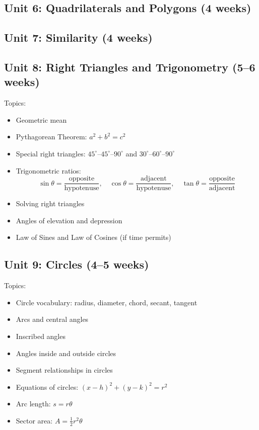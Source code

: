 \documentclass[12pt,oneside]{book}
\begin{document}
\subsection*{Unit 6: Quadrilaterals and Polygons (4 weeks)}

\subsection*{Unit 7: Similarity (4 weeks)}

\subsection*{Unit 8: Right Triangles and Trigonometry (5--6 weeks)}
Topics:
\begin{itemize}[leftmargin=2em]
    \item Geometric mean
    \item Pythagorean Theorem: $a^2 + b^2 = c^2$
    \item Special right triangles: $45^\circ$--$45^\circ$--$90^\circ$ and $30^\circ$--$60^\circ$--$90^\circ$
    \item Trigonometric ratios:
    \[
    \sin\theta = \frac{\text{opposite}}{\text{hypotenuse}},\quad
    \cos\theta = \frac{\text{adjacent}}{\text{hypotenuse}},\quad
    \tan\theta = \frac{\text{opposite}}{\text{adjacent}}
    \]
    \item Solving right triangles
    \item Angles of elevation and depression
    \item Law of Sines and Law of Cosines (if time permits)
\end{itemize}

\subsection*{Unit 9: Circles (4--5 weeks)}
Topics:
\begin{itemize}[leftmargin=2em]
    \item Circle vocabulary: radius, diameter, chord, secant, tangent
    \item Arcs and central angles
    \item Inscribed angles
    \item Angles inside and outside circles
    \item Segment relationships in circles
    \item Equations of circles: $(x-h)^2 + (y-k)^2 = r^2$
    \item Arc length: $s = r\theta$
    \item Sector area: $A = \tfrac{1}{2}r^2\theta$
\end{itemize}
\end{document}
